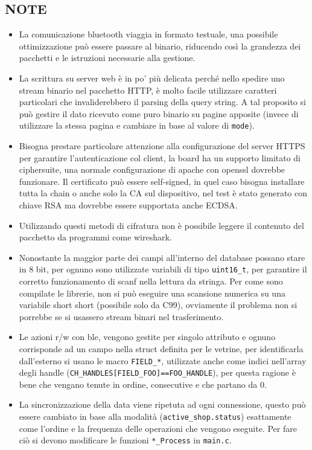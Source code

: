 \subsection{NOTE}
\begin{itemize}
\item La comunicazione bluetooth viaggia in formato testuale, una possibile ottimizzazione pu\`o essere passare al binario, riducendo cos\`i la grandezza dei pacchetti e le istruzioni necessarie alla gestione. 
\item La scrittura su server web \`e in po' pi\`u delicata perch\'e nello spedire uno stream binario nel pacchetto HTTP, \`e molto facile utilizzare caratteri particolari che invaliderebbero il parsing della query string. A tal proposito si pu\`o gestire il dato ricevuto come puro binario su pagine apposite (invece di utilizzare la stessa pagina e cambiare in base al valore di \texttt{mode}).
\item Bisogna prestare particolare attenzione alla configurazione del server HTTPS per garantire l'autenticazione col client, la board ha un supporto limitato di ciphersuite, una normale configurazione di apache con openssl dovrebbe funzionare. Il certificato pu\`o essere self-signed, in quel caso bisogna installare tutta la chain o anche solo la CA sul dispositivo, nel test \`e stato generato con chiave RSA ma dovrebbe essere supportata anche ECDSA.
\item Utilizzando questi metodi di cifratura non \`e possibile leggere il contenuto del pacchetto da programmi come wireshark.
\item Nonostante la maggior parte dei campi all'interno del database possano stare in 8 bit, per ognuno sono utilizzate variabili di tipo \texttt{uint16\_t}, per garantire il corretto funzionamento di scanf nella lettura da stringa. Per come sono compilate le librerie, non si pu\`o eseguire una scansione numerica su una variabile short short (possibile solo da C99), ovviamente il problema non si porrebbe se si usassero stream binari nel trasferimento.
\item Le azioni r/w con ble, vengono gestite per singolo attributo e ognuno corrisponde ad un campo nella struct definita per le vetrine, per identificarla dall'esterno si usano le macro \texttt{FIELD\_*}, utilizzate anche come indici nell'array degli handle (\texttt{CH\_HANDLES[FIELD\_FOO]==FOO\_HANDLE}), per questa ragione \`e bene che vengano tenute in ordine, consecutive e che partano da 0.
\item La sincronizzazione della data viene ripetuta ad ogni connessione, questo pu\`o essere cambiato in base alla modalit\`a (\texttt{active\_shop.status}) esattamente come l'ordine e la frequenza delle operazioni che vengono eseguite. Per fare ci\`o si devono modificare le funzioni \texttt{*\_Process} in \texttt{main.c}.

\end{itemize}
